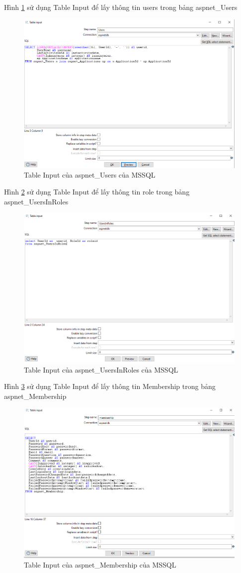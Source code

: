 \documentclass{article}[14pt]
\begin{document}
Hình \ref{fig:usersl} sử dụng Table Input để lấy thông tin users trong bảng aspnet\_Users

\begin{figure}
    \centering
    \includegraphics[width=0.5\linewidth]{images/users.png}
    \caption{Table Input của aspnet\_Users của MSSQL}
    \label{fig:usersl}
\end{figure}

Hình \ref{fig:UsersInRoles} sử dụng Table Input để lấy thông tin role trong bảng aspnet\_UsersInRoles

\begin{figure}
    \centering
    \includegraphics[width=0.5\linewidth]{images/UsersInRoles.png}
    \caption{Table Input của aspnet\_UsersInRoles của MSSQL}
    \label{fig:UsersInRoles}
\end{figure}

Hình \ref{fig:Membership} sử dụng Table Input để lấy thông tin Membership trong bảng aspnet\_Membership

\begin{figure}
    \centering
    \includegraphics[width=0.5\linewidth]{images/Membership.png}
    \caption{Table Input của aspnet\_Membership của MSSQL}
    \label{fig:Membership}
\end{figure}
\end{document}
